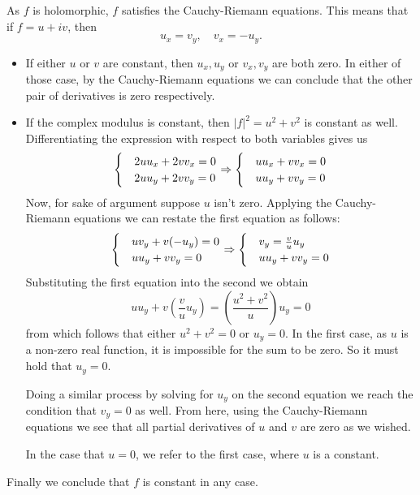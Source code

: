\documentclass[12pt]{memoir}
\begin{document}
\begin{ptcbr}
    As $f$ is holomorphic, $f$ satisfies the Cauchy-Riemann equations. This means that if $f=u+iv$, then 
    $$u_x=v_y,\quad v_x=-u_y.$$
    \begin{itemize}
        \itemsep=-0.4em
        \item If either $u$ or $v$ are constant, then $u_x,u_y$ or $v_x,v_y$ are both zero. In either of those case, by the Cauchy-Riemann equations we can conclude that the other pair of derivatives is zero respectively. 
        \item If the complex modulus is constant, then $|f|^2=u^2+v^2$ is constant as well. Differentiating the expression with respect to both variables gives us 
        $$\begin{cases}
            &2uu_x+2vv_x=0\\
            &2uu_y+2vv_y=0
        \end{cases}\Rightarrow
        \begin{cases}
            &uu_x+vv_x=0\\
            &uu_y+vv_y=0
        \end{cases} $$
        Now, for sake of argument suppose $u$ isn't zero. Applying the Cauchy-Riemann equations we can restate the first equation as follows:
        $$
        \begin{cases}
            &uv_y+v(-u_y)=0\\
            &uu_y+vv_y=0
        \end{cases} \Rightarrow
        \begin{cases}
            &v_y=\frac{v}{u}u_y\\
            &uu_y+vv_y=0
        \end{cases} $$
        Substituting the first equation into the second we obtain
        $$ uu_y+v\left(\frac{v}{u}u_y\right)=\left(\frac{u^2+v^2}{u}\right)u_y=0$$
        from which follows that either $u^2+v^2=0$ or $u_y=0$. In the first case, as $u$ is a non-zero real function, it is impossible for the sum to be zero. So it must hold that $u_y=0$.\par 
        Doing a similar process by solving for $u_y$ on the second equation we reach the condition that $v_y=0$ as well. From here, using the Cauchy-Riemann equations we see that all partial derivatives of $u$ and $v$ are zero as we wished.\par 
        In the case that $u=0$, we refer to the first case, where $u$ is a constant. 
    \end{itemize}
    Finally we conclude that $f$ is constant in any case.
\end{ptcbr}
\end{document}
